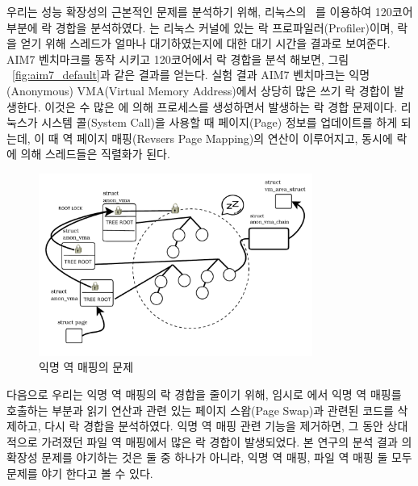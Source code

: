 우리는 성능 확장성의 근본적인 문제를 분석하기 위해, 리눅스의
~\cite{LOCKSTAT}를 이용하여 120코어 부분에 락 경합을 분석하였다.
는 리눅스 커널에 있는 락 프로파일러(Profiler)이며, 
락을 얻기 위해 스레드가 얼마나 대기하였는지에 대한 대기 시간을 결과로 보여준다.
AIM7 벤치마크를 동작 시키고 120코어에서 락 경합을 분석 해보면, 
그림 ~\ref{fig:aim7_default}과 같은 결과를 얻는다.
실험 결과 AIM7 벤치마크는 익명(Anonymous) VMA(Virtual Memory Address)에서 상당히 많은 쓰기 락 경합이
발생한다.
이것은 수 많은 에 의해 프로세스를 생성하면서 발생하는 락 경합 문제이다.
리눅스가 시스템 콜(System Call)을 사용할 때 페이지(Page) 정보를
업데이트를 하게 되는데, 이 때 역 페이지 매핑(Revsers Page Mapping)의 연산이 이루어지고, 
동시에 락에 의해 스레드들은 직렬화가 된다. 

 \begin{figure}[h]
    \centering
    \includegraphics[width=0.8\textwidth]{fig/anon_vma_rmap}
    \caption{익명 역 매핑의 문제}
  \label{fig:anon_vma_rmap}
\end{figure}

다음으로 우리는 익명 역 매핑의 락 경합을 줄이기 위해, 임시로 에서 익명 역 매핑를 호출하는 부분과 
읽기 연산과 관련 있는 페이지 스왑(Page Swap)과 관련된 코드를 삭제하고, 다시 락 경합을 분석하였다. 
익명 역 매핑 관련 기능을 제거하면, 그 동안 상대적으로 가려졌던 파일 역 매핑에서 많은 락 경합이 발생되었다.
본 연구의 분석 결과 의 확장성 문제를 야기하는 것은 둘 중 하나가 아니라, 익명 역 매핑, 
파일 역 매핑 둘 모두 문제를 야기 한다고 볼 수 있다.

